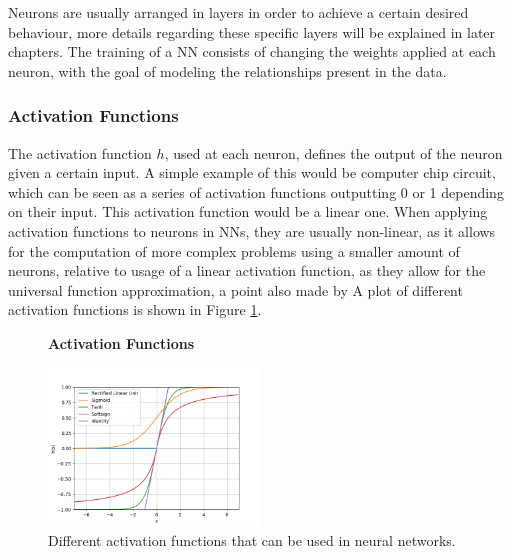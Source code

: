 Neurons are usually arranged in layers in order to achieve a certain desired
behaviour, more details regarding these specific layers will be explained in
later chapters. The training of a \gls{NN} consists of changing the weights
applied at each neuron, with the goal of modeling the relationships present in
the data.


\subsubsection{Activation Functions} \label{subsubsec:activation_functions}

The activation function $h$, used at each neuron, defines the output of the
neuron given a certain input. A simple example of this would be computer chip
circuit, which can be seen as a series of activation functions outputting 0 or
1 depending on their input. This activation function would be a linear one.
When applying activation functions to neurons in \glspl{NN}, they are usually
non-linear, as it allows for the computation of more complex problems using a
smaller amount of neurons, relative to usage of a linear activation function,
as they allow for the universal function approximation, a point also made by
\citet{6797088} A plot of different activation functions is shown in Figure
\ref{fig:activation_functions}.

\begin{figure}
    \centering
    \textbf{Activation Functions}\par\medskip
    \includegraphics[width=0.5\textwidth]{./pictures/method/activation_functions.png}
    \caption{Different activation functions that can be used in neural
        networks.}
    \label{fig:activation_functions}
\end{figure}

